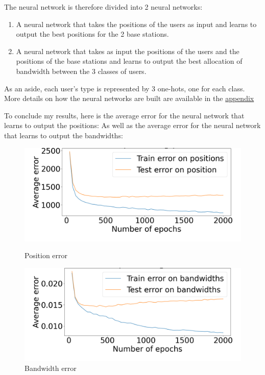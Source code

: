\documentclass[letterpaper]{article}
\begin{document}
The neural network is therefore divided into 2 neural networks:

\begin{enumerate}
    \item A neural network that takes the positions of the users as input and learns to output the best positions for the 2 base stations.
    \item A neural network that takes as input the positions of the users and the positions of the base stations and learns to output the best allocation of bandwidth between the 3 classes of users.
\end{enumerate}

As an aside, each user's type is represented by 3 one-hots, one for each class.
More details on how the neural networks are built are available in the \hyperref[appendix]{appendix}

To conclude my results, here is the average error for the neural network that learns to output the positions:
As well as the average error for the neural network that learns to output the bandwidths:

\begin{figure}[H]
    \centering
    \begin{minipage}[b]{0.45\textwidth}
        \centering
        \includegraphics[width=\textwidth]{images/mix_pos.png}
        \caption{Position error}
        \label{fig:image5}
    \end{minipage}
    \hspace{0.05\textwidth}
    \begin{minipage}[b]{0.45\textwidth}
        \centering
        \includegraphics[width=\textwidth]{images/bw_error_epochs.png}
        \caption{Bandwidth error}
        \label{fig:image6}
    \end{minipage}
\end{figure}
\end{document}
